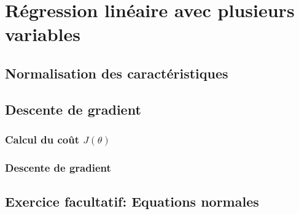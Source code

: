 \section{Régression linéaire avec plusieurs variables}
\subsection{Normalisation des caractéristiques}
\subsection{Descente de gradient}
\subsubsection{Calcul du coût $J(\theta)$}
\subsubsection{Descente de gradient}
\subsection{Exercice facultatif: Equations normales}

